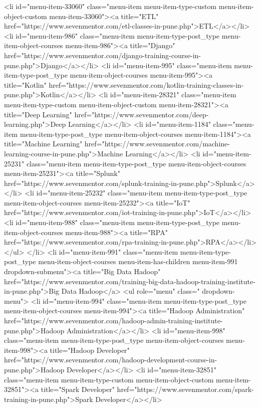 {<li id="menu-item-33060" class="menu-item menu-item-type-custom menu-item-object-custom menu-item-33060"><a title="ETL" href="https://www.sevenmentor.com/etl-classes-in-pune.php">ETL</a></li>
<li id="menu-item-986" class="menu-item menu-item-type-post_type menu-item-object-courses menu-item-986"><a title="Django" href="https://www.sevenmentor.com/django-training-course-in-pune.php">Django</a></li>
<li id="menu-item-995" class="menu-item menu-item-type-post_type menu-item-object-courses menu-item-995"><a title="Kotlin" href="https://www.sevenmentor.com/kotlin-training-classes-in-pune.php">Kotlin</a></li>
<li id="menu-item-28321" class="menu-item menu-item-type-custom menu-item-object-custom menu-item-28321"><a title="Deep Learning" href="https://www.sevenmentor.com/deep-learning.php">Deep Learning</a></li>
<li id="menu-item-1184" class="menu-item menu-item-type-post_type menu-item-object-courses menu-item-1184"><a title="Machine Learning" href="https://www.sevenmentor.com/machine-learning-course-in-pune.php">Machine Learning</a></li>
<li id="menu-item-25231" class="menu-item menu-item-type-post_type menu-item-object-courses menu-item-25231"><a title="Splunk" href="https://www.sevenmentor.com/splunk-training-in-pune.php">Splunk</a></li>
<li id="menu-item-25232" class="menu-item menu-item-type-post_type menu-item-object-courses menu-item-25232"><a title="IoT" href="https://www.sevenmentor.com/iot-training-in-pune.php">IoT</a></li>
<li id="menu-item-988" class="menu-item menu-item-type-post_type menu-item-object-courses menu-item-988"><a title="RPA" href="https://www.sevenmentor.com/rpa-training-in-pune.php">RPA</a></li>
</ul>
</li>
<li id="menu-item-991" class="menu-item menu-item-type-post_type menu-item-object-courses menu-item-has-children menu-item-991 dropdown-submenu"><a title="Big Data Hadoop" href="https://www.sevenmentor.com/training-big-data-hadoop-training-institute-in-pune.php">Big Data Hadoop</a>
<ul role="menu" class=" dropdown-menu">
<li id="menu-item-994" class="menu-item menu-item-type-post_type menu-item-object-courses menu-item-994"><a title="Hadoop Administration" href="https://www.sevenmentor.com/hadoop-admin-training-institute-pune.php">Hadoop Administration</a></li>
<li id="menu-item-998" class="menu-item menu-item-type-post_type menu-item-object-courses menu-item-998"><a title="Hadoop Developer" href="https://www.sevenmentor.com/hadoop-development-course-in-pune.php">Hadoop Developer</a></li>
<li id="menu-item-32851" class="menu-item menu-item-type-custom menu-item-object-custom menu-item-32851"><a title="Spark Developer" href="https://www.sevenmentor.com/spark-training-in-pune.php">Spark Developer</a></li>
}
